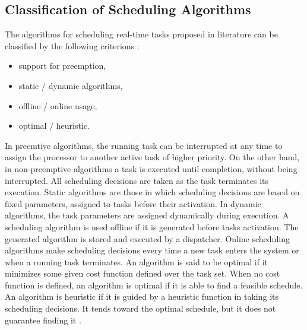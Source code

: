 \subsection{Classification of Scheduling Algorithms}
The algorithms for scheduling real-time tasks proposed in literature can be classified by the following criterions \cite{buttazzo2011hard}:
\begin{itemize}
    \item support for preemption,
    \item static / dynamic algorithms,
    \item offline / online usage,
    \item optimal / heuristic.
\end{itemize}
In preemtive algorithms, the running task can be interrupted at any time to assign the processor to another active task of higher priority.
On the other hand, in non-preemptive algorithms a task is executed until completion, without being interrupted. 
All scheduling decisions are taken as the task terminates its execution.
Static algorithms are those in which scheduling decisions are based on fixed parameters, assigned to tasks before their activation.
In dynamic algorithms, the task parameters are assigned dynamically during execution.
A scheduling algorithm is used offline if it is generated before tasks activation. 
The generated algorithm is stored and executed by a dispatcher.
Online scheduling algorithms make scheduling decisions every time a new task enters the system or when a running task terminates.
An algorithm is said to be optimal if it minimizes some given cost function defined over the task set. 
When no cost function is defined, an algorithm is optimal if it is able to find a feasible schedule.
An algorithm is heuristic if it is guided by a heuristic function in taking its scheduling decisions. 
It tends toward the optimal schedule, but it does not guarantee finding it \cite{buttazzo2011hard}.

